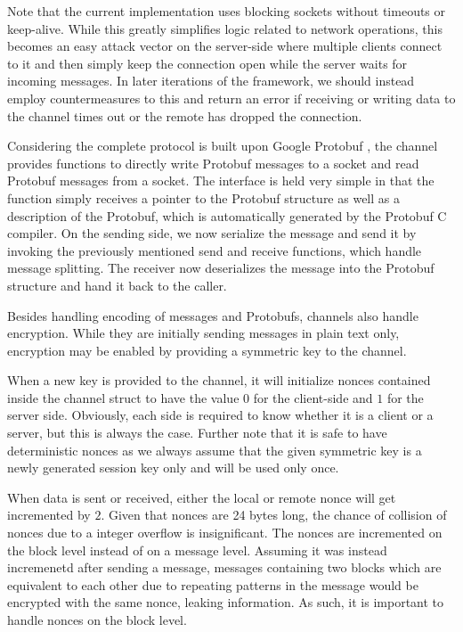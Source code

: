 Note that the current implementation uses blocking sockets without timeouts or keep-alive.
While this greatly simplifies logic related to network operations, this becomes an easy attack vector on the server-side where multiple clients connect to it and then simply keep the connection open while the server waits for incoming messages.
In later iterations of the framework, we should instead employ countermeasures to this and return an error if receiving or writing data to the channel times out or the remote has dropped the connection.

Considering the complete protocol is built upon Google Protobuf \cite{varda2008protocol}, the channel provides functions to directly write Protobuf messages to a socket and read Protobuf messages from a socket.
The interface is held very simple in that the function simply receives a pointer to the Protobuf structure as well as a description of the Protobuf, which is automatically generated by the Protobuf C compiler.
On the sending side, we now serialize the message and send it by invoking the previously mentioned send and receive functions, which handle message splitting.
The receiver now deserializes the message into the Protobuf structure and hand it back to the caller.

Besides handling encoding of messages and Protobufs, channels also handle encryption.
While they are initially sending messages in plain text only, encryption may be enabled by providing a symmetric key to the channel.

When a new key is provided to the channel, it will initialize nonces contained inside the channel struct to have the value $0$ for the client-side and $1$ for the server side.
Obviously, each side is required to know whether it is a client or a server, but this is always the case.
Further note that it is safe to have deterministic nonces as we always assume that the given symmetric key is a newly generated session key only and will be used only once.

When data is sent or received, either the local or remote nonce will get incremented by $2$.
Given that nonces are 24 bytes long, the chance of collision of nonces due to a integer overflow is insignificant.
The nonces are incremented on the block level instead of on a message level.
Assuming it was instead incremenetd after sending a message, messages containing two blocks which are equivalent to each other due to repeating patterns in the message would be encrypted with the same nonce, leaking information.
As such, it is important to handle nonces on the block level.

